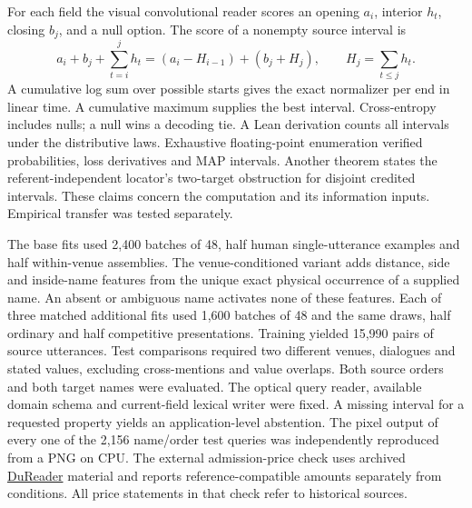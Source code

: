 \documentclass[12pt,a4paper]{article}
\providecommand{\DIFadd}[1]{{\protect\color{blue} \sf #1}} %
\begin{document}
\DIFadd{For each field the visual convolutional reader scores an opening $a_i$, interior $h_t$, closing $b_j$, and a null option. The score of a nonempty source interval is
}\[
 a_i+b_j+\sum_{t=i}^{j}h_t=(a_i-H_{i-1})+(b_j+H_j),\qquad H_j=\sum_{t\le j}h_t .
\]
\DIFadd{A cumulative log sum over possible starts gives the exact normalizer per end in linear time. A cumulative maximum supplies the best interval. Cross-entropy includes nulls; a null wins a decoding tie. A Lean derivation counts all intervals under the distributive laws. Exhaustive floating-point enumeration verified probabilities, loss derivatives and MAP intervals. Another theorem states the referent-independent locator's two-target obstruction for disjoint credited intervals. These claims concern the computation and its information inputs. Empirical transfer was tested separately.
}

\DIFadd{The base fits used 2,400 batches of 48, half human single-utterance examples and half within-venue assemblies. The venue-conditioned variant adds distance, side and inside-name features from the unique exact physical occurrence of a supplied name. An absent or ambiguous name activates none of these features. Each of three matched additional fits used 1,600 batches of 48 and the same draws, half ordinary and half competitive presentations. Training yielded 15,990 pairs of source utterances. Test comparisons required two different venues, dialogues and stated values, excluding cross-mentions and value overlaps. Both source orders and both target names were evaluated. The optical query reader, available domain schema and current-field lexical writer were fixed. A missing interval for a requested property yields an application-level abstention. The pixel output of every one of the 2,156 name/order test queries was independently reproduced from a PNG on CPU. The external admission-price check uses archived }\href{https://aclanthology.org/W18-2605/}{\DIFadd{DuReader}} \DIFadd{material and reports reference-compatible amounts separately from conditions. All price statements in that check refer to historical sources.
}
\end{document}
